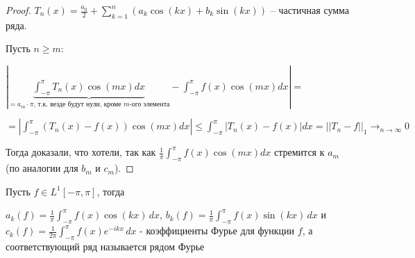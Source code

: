 \begin{proof}

    $T_n (x) = \frac{a_0}{2} + \sum_{k = 1}^n (a_k \cos (kx) + b_k \sin (kx))$ -- частичная сумма ряда.

    Пусть $n \geq m$:

    $|\underbrace{\int_{-\pi}^{\pi} T_n(x) \cos{(m x)} dx}_{= a_m \cdot \pi \text{, т.к. везде будут нули, кроме $m$-ого элемента}} - \int_{-\pi}^{\pi} f(x) \cos{(m x)} dx| =$
    
    $= |\int_{-\pi}^{\pi} \left(T_n(x) - f(x)\right) \cos{(m x)} dx | \leq \int_{-\pi}^{\pi} |T_n(x) - f(x)| dx = || T_n - f ||_1 \to_{n \to \infty} 0$

    Тогда доказали, что хотели, так как $\frac{1}{\pi} \int_{-\pi}^{\pi} f(x) \cos{(mx)} dx$ стремится к $a_m$ (по аналогии для $b_m$ и $c_m$).


\end{proof}

\begin{definition}
    Пусть $f \in L^1 [-\pi, \pi]$, тогда
    
    $a_k (f) = \frac{1}{\pi} \int_{-\pi}^\pi f(x) \cos (kx) \, dx$, $b_k (f) = \frac{1}{\pi} \int_{-\pi}^\pi f(x) \sin (kx) \, dx$ и 
    $c_k(f) = \frac{1}{2\pi} \int_{-\pi}^\pi f(x) e^{-ikx} \, dx$ - коэффициенты Фурье для функции $f$, а соответствующий ряд называется рядом Фурье
\end{definition}

